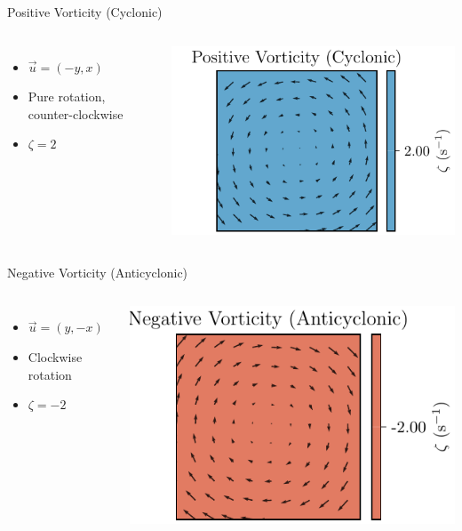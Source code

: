 \begin{frame}{Positive Vorticity (Cyclonic)}
	\begin{columns}
		\begin{itemize}
			\item \( \vec{u} = (-y, x) \)
			\item Pure rotation, counter-clockwise
			\item \( \zeta = 2 \)
		\end{itemize}

		\includegraphics[width=\linewidth]{../images/vorticity_plot3.pdf}
	\end{columns}
\end{frame}

\begin{frame}{Negative Vorticity (Anticyclonic)}
	\begin{columns}
		\column{0.5\textwidth}
		\begin{itemize}
			\item \( \vec{u} = (y, -x) \)
			\item Clockwise rotation
			\item \( \zeta = -2 \)
		\end{itemize}

		\column{0.5\textwidth}
		\includegraphics[width=\linewidth]{../images/vorticity_plot4.pdf}
	\end{columns}
\end{frame}


